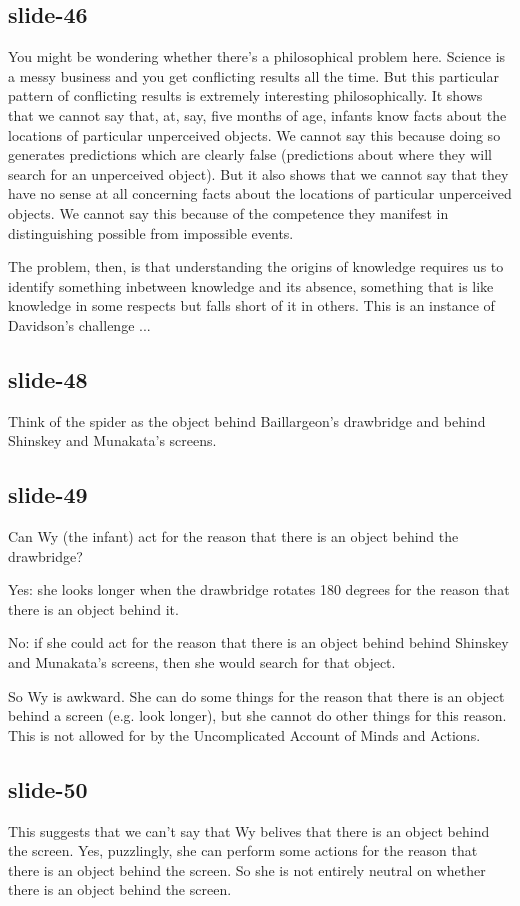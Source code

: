 \documentclass[12pt,\papersize]{extarticle}
\begin{document}
\subsection{slide-46}
You might be wondering whether there's a philosophical problem here.
Science is a messy business and you get conflicting results all the time.
But this particular pattern of conflicting results is extremely interesting philosophically.
It shows that we cannot say that, at, say, five months of age, infants know facts about the
locations
of particular unperceived objects.
We cannot say this because doing so generates predictions which are clearly false (predictions
about where they will search for an unperceived object).
But it also shows that we cannot say that they have no sense at all concerning facts about the
locations of particular unperceived objects.  We cannot say this because of the
competence they manifest in distinguishing possible from impossible events.

The problem, then, is that understanding the origins of knowledge requires us to identify
something inbetween knowledge and its absence, something that is like knowledge in some
respects but falls short of it in others.
This is an instance of Davidson's challenge ...

\subsection{slide-48}
Think of the spider as the object behind Baillargeon’s drawbridge
and behind Shinskey and Munakata’s screens.

\subsection{slide-49}
Can Wy (the infant) act for the reason that there is an object behind
the drawbridge?

Yes: she looks longer when the drawbridge rotates 180 degrees
for the reason that there is an object behind it.

No: if she could act for the reason that there is an object behind
behind Shinskey and Munakata’s screens, then she would search for that object.

So Wy is awkward. She can do some things for the reason that there is an
object behind a screen (e.g. look longer), but she cannot do other things
for this reason.
This is not allowed for by the Uncomplicated Account of Minds and Actions.

\subsection{slide-50}
This suggests that we can’t say that Wy belives that there is an object
behind the screen.
Yes, puzzlingly, she can perform some actions for the reason that
there is an object behind the screen.
So she is not entirely neutral on whether there is an object behind the screen.
\end{document}
